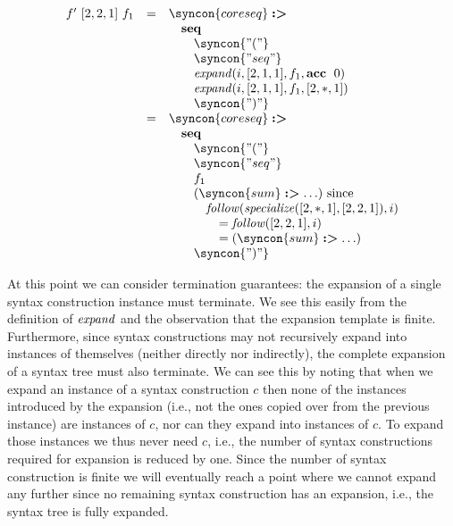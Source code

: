 \documentclass{kththesis}
\begin{document}
$$
\begin{array}{rcl}
f'~[2, 2, 1]~f_1 & = & \syncon{coreseq} \tagged \\
& & \quad \seq \\
& & \qquad \syncon{"("} \\
& & \qquad \syncon{"seq"} \\
& & \qquad \expand(i, [2, 1, 1], f_1, \acc~0) \\
& & \qquad \expand(i, [2, 1, 1], f_1, [2, *, 1]) \\
& & \qquad \syncon{")"} \\
& = & \syncon{coreseq} \tagged \\
& & \quad \seq \\
& & \qquad \syncon{"("} \\
& & \qquad \syncon{"seq"} \\
& & \qquad f_1 \\
& & \qquad (\syncon{sum} \tagged \ldots) \text{ since} \\
& & \qquad \quad \follow(\specialize([2, *, 1], [2, 2, 1]), i) \\
& & \qquad \qquad = \follow([2, 2, 1], i) \\
& & \qquad \qquad = (\syncon{sum} \tagged \ldots) \\
& & \qquad \syncon{")"} \\
\end{array}
$$

At this point we can consider termination guarantees: the expansion of a single syntax construction instance must terminate. We see this easily from the definition of $\mathit{expand}$ and the observation that the expansion template is finite. Furthermore, since syntax constructions may not recursively expand into instances of themselves (neither directly nor indirectly), the complete expansion of a syntax tree must also terminate. We can see this by noting that when we expand an instance of a syntax construction $c$ then none of the instances introduced by the expansion (i.e., not the ones copied over from the previous instance) are instances of $c$, nor can they expand into instances of $c$. To expand those instances we thus never need $c$, i.e., the number of syntax constructions required for expansion is reduced by one. Since the number of syntax construction is finite we will eventually reach a point where we cannot expand any further since no remaining syntax construction has an expansion, i.e., the syntax tree is fully expanded.
\end{document}
